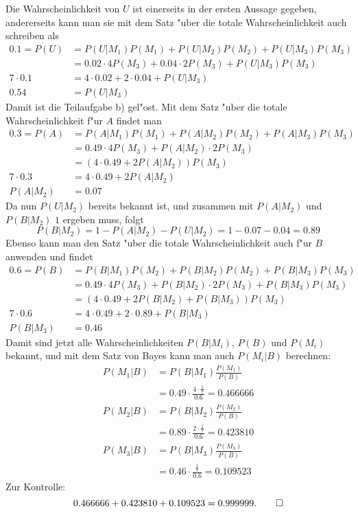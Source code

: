 \begin{loesung}
Die Wahrscheinlichkeit von $U$ ist einerseits in der ersten Aussage
gegeben, andererseits kann man sie mit dem Satz "uber die totale
Wahrscheinlichkeit auch schreiben als
\begin{align*}
0.1=P(U)
&=P(U|M_1)P(M_1)+P(U|M_2)P(M_2)+P(U|M_3)P(M_3)
\\
&=0.02\cdot 4P(M_3)+0.04\cdot 2P(M_3)+P(U|M_3)P(M_3)
\\
7\cdot 0.1&=4\cdot 0.02+2\cdot 0.04+P(U|M_3)
\\
0.54&=P(U|M_3)
\end{align*}
Damit ist die Teilaufgabe b) gel"ost.
Mit dem Satz "uber die totale Wahrscheinlichkeit f"ur $A$ findet man
\begin{align*}
0.3=P(A)&=
P(A|M_1)P(M_1)
+
P(A|M_2)P(M_2)
+
P(A|M_3)P(M_3)
\\
&=
0.49\cdot 4P(M_3)
+
P(A|M_2)\cdot 2P(M_3)
\\
&=
(4\cdot 0.49
+
2P(A|M_2))P(M_3)
\\
7\cdot 0.3
&=4\cdot 0.49+2P(A|M_2)
\\
P(A|M_2)&=0.07
\end{align*}
Da nun $P(U|M_2)$ bereits bekannt ist, und zusammen mit $P(A|M_2)$
und $P(B|M_2)$ $1$ ergeben muss, folgt
\[
P(B|M_2)=1-P(A|M_2)-P(U|M_2)=1-0.07-0.04=0.89
\]
Ebenso kann man den Satz "uber die totale Wahrscheinlichkeit auch
f"ur $B$ anwenden und findet
\begin{align*}
0.6=P(B)
&=
P(B|M_1)P(M_2)
+
P(B|M_2)P(M_2)
+
P(B|M_3)P(M_3)
\\
&=
0.49\cdot 4P(M_3)
+
P(B|M_2)\cdot 2P(M_3)
+
P(B|M_3)P(M_3)
\\
&=
(4\cdot 0.49
+
2P(B|M_2)
+
P(B|M_3))P(M_3)
\\
7\cdot 0.6
&=
4\cdot 0.49+2\cdot 0.89 +P(B|M_3)
\\
P(B|M_3)&=0.46
\end{align*}
Damit sind jetzt alle Wahrscheinlichkeiten $P(B|M_i)$, $P(B)$ und
$P(M_i)$ bekannt, und mit dem Satz von Bayes kann man auch $P(M_i|B)$
berechnen:
\begin{align*}
P(M_1|B)&=
P(B|M_1)\frac{P(M_1)}{P(B)}
\\
&=0.49\cdot\frac{4\cdot\frac17}{0.6}
=0.466666
\\
P(M_2|B)&=
P(B|M_2)\frac{P(M_2)}{P(B)}
\\
&=0.89\cdot\frac{2\cdot\frac17}{0.6}
=0.423810
\\
P(M_3|B)&=
P(B|M_3)\frac{P(M_3)}{P(B)}
\\
&=0.46\cdot\frac{\frac17}{0.6}
=0.109523
\end{align*}
Zur Kontrolle:
\[
0.466666+0.423810+0.109523=0.999999.
\qedhere
\]
\end{loesung}

